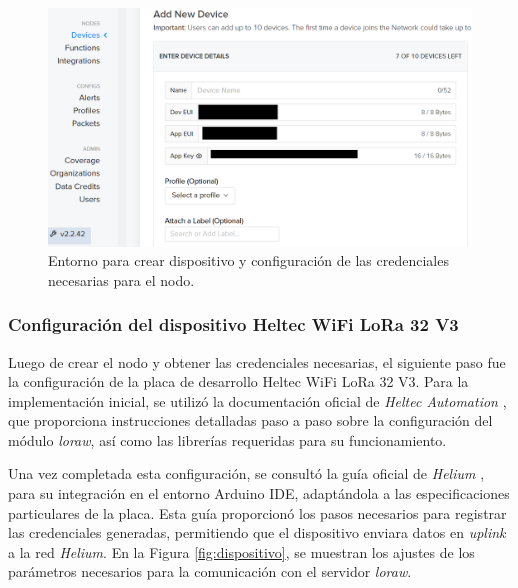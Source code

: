 \begin{figure}[H]
\leavevmode
\begin{minipage}{\textwidth}
\begin{center}
\includegraphics[width=\textwidth]{./capitulo_04/imagen/helium.png}
\caption{Entorno para crear dispositivo y configuración de las credenciales necesarias para el nodo. \label{fig:helium}}
\end{center}
\end{minipage}
\end{figure}

\subsubsection{Configuración del dispositivo Heltec WiFi LoRa 32 V3}

Luego de crear el nodo y obtener las credenciales necesarias, el siguiente paso fue la configuración de la placa de desarrollo Heltec WiFi LoRa 32 V3. Para la implementación inicial, se utilizó la documentación oficial de \textit{Heltec Automation} \cite{heltec}, que proporciona instrucciones detalladas paso a paso sobre la configuración del módulo \textit{\acrshort{loraw}}, así como las librerías requeridas para su funcionamiento.

Una vez completada esta configuración, se consultó la guía oficial de \textit{Helium} \cite{heliumDocs1}, para su integración en el entorno Arduino IDE, adaptándola a las especificaciones particulares de la placa. Esta guía proporcionó los pasos necesarios para registrar las credenciales generadas, permitiendo que el dispositivo enviara datos en \textit{uplink} a la red \textit{Helium}. En la Figura \ref{fig:dispositivo}, se muestran los ajustes de los parámetros necesarios para la comunicación con el servidor \textit{\acrshort{loraw}}.

